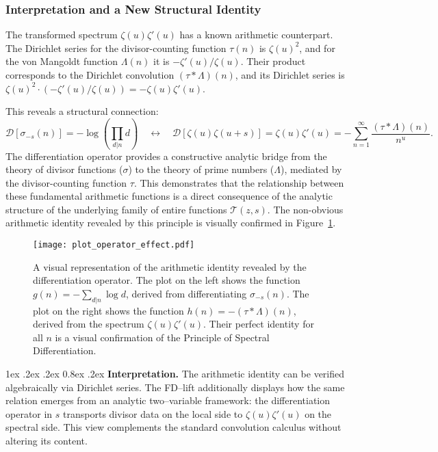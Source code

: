 \documentclass[11pt,a4paper]{amsart}
\makeatletter
\renewcommand\paragraph{\@startsection{paragraph}{4}{\z@}%
  {1ex \@plus .2ex \@minus .2ex}%
  {0.8ex \@plus .2ex}%
  {\normalfont\bfseries}}
\theoremstyle{plain}
\theoremstyle{definition}
\theoremstyle{remark}
\makeatother
\begin{document}
\subsubsection{Interpretation and a New Structural Identity}
The transformed spectrum $\zeta(u)\zeta'(u)$ has a known arithmetic counterpart. The Dirichlet series for the divisor-counting function $\tau(n)$ is $\zeta(u)^2$, and for the von Mangoldt function $\Lambda(n)$ it is $-\zeta'(u)/\zeta(u)$. Their product corresponds to the Dirichlet convolution $(\tau * \Lambda)(n)$, and its Dirichlet series is $\zeta(u)^2 \cdot (-\zeta'(u)/\zeta(u)) = -\zeta(u)\zeta'(u)$.

This reveals a structural connection:
\[
\mathcal{D}[\sigma_{-s}(n)] = -\log\left(\prod_{d|n} d\right) \quad \longleftrightarrow \quad \mathcal{D}[\zeta(u)\zeta(u+s)] = \zeta(u)\zeta'(u) = - \sum_{n=1}^\infty \frac{(\tau * \Lambda)(n)}{n^u}.
\]
The differentiation operator provides a constructive analytic bridge from the theory of divisor functions ($\sigma$) to the theory of prime numbers ($\Lambda$), mediated by the divisor-counting function $\tau$. This demonstrates that the relationship between these fundamental arithmetic functions is a direct consequence of the analytic structure of the underlying family of entire functions $\mathcal{T}(z,s)$. The non-obvious arithmetic identity revealed by this principle is visually confirmed in Figure~\ref{fig:operator_effect}.

\begin{figure}[t]
\centering
\texttt{[image: plot\_operator\_effect.pdf]}
\caption{A visual representation of the arithmetic identity revealed by the differentiation operator. The plot on the left shows the function $g(n) = -\sum_{d|n} \log d$, derived from differentiating $\sigma_{-s}(n)$. The plot on the right shows the function $h(n) = -(\tau * \Lambda)(n)$, derived from the spectrum $\zeta(u)\zeta'(u)$. Their perfect identity for all $n$ is a visual confirmation of the Principle of Spectral Differentiation.}
\label{fig:operator_effect}
\end{figure}

\FloatBarrier

\paragraph{\textbf{Interpretation.}} The arithmetic identity can be verified algebraically via Dirichlet series. The FD--lift additionally displays how the same relation emerges from an analytic two--variable framework: the differentiation operator in $s$ transports divisor data on the local side to $\zeta(u)\zeta'(u)$ on the spectral side. This view complements the standard convolution calculus without altering its content.
\end{document}
